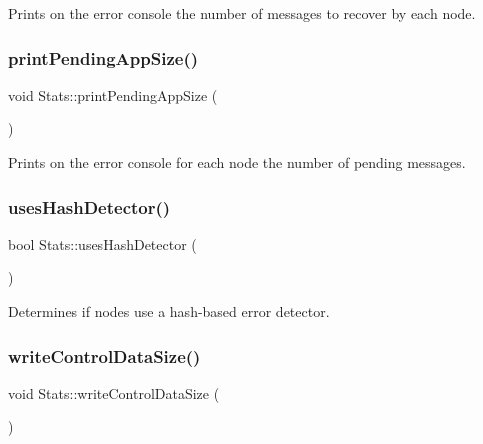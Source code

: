 Prints on the error console the number of messages to recover by each node. 

\mbox{\label{class_stats_a5b65312e84788b3fe5e19c8e535a03f4}} 
\subsubsection{\texorpdfstring{print\+Pending\+App\+Size()}{printPendingAppSize()}}
{\footnotesize\ttfamily void Stats\+::print\+Pending\+App\+Size (\begin{DoxyParamCaption}{ }\end{DoxyParamCaption})\hspace{0.3cm}{\ttfamily [private]}}



Prints on the error console for each node the number of pending messages. 

\mbox{\label{class_stats_a509d8e8fba4312eeffe2c6cee722f30f}} 
\subsubsection{\texorpdfstring{uses\+Hash\+Detector()}{usesHashDetector()}}
{\footnotesize\ttfamily bool Stats\+::uses\+Hash\+Detector (\begin{DoxyParamCaption}{ }\end{DoxyParamCaption})\hspace{0.3cm}{\ttfamily [private]}}



Determines if nodes use a hash-\/based error detector. 

\mbox{\label{class_stats_a49086baebc806841600c8545b5315149}} 
\subsubsection{\texorpdfstring{write\+Control\+Data\+Size()}{writeControlDataSize()}}
{\footnotesize\ttfamily void Stats\+::write\+Control\+Data\+Size (\begin{DoxyParamCaption}{ }\end{DoxyParamCaption})\hspace{0.3cm}{\ttfamily [private]}}



